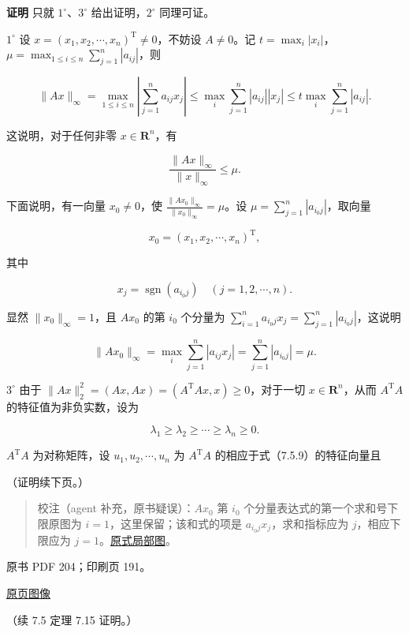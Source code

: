 \documentclass[
  10pt,
  fontset=fandol]{ctexart}
\begin{document}
\textbf{证明} 只就 \(1^\circ\)、\(3^\circ\) 给出证明，\(2^\circ\)
同理可证。

\(1^\circ\) 设 \(x=(x_1,x_2,\cdots,x_n)^{\mathrm T}\neq0\)，不妨设
\(A\neq0\)。记
\(t=\max_i|x_i|\)，\(\mu=\max_{1\leqslant i\leqslant n}\sum_{j=1}^{n}|a_{ij}|\)，则

\[
\|Ax\|_\infty
=\max_{1\leqslant i\leqslant n}\left|\sum_{j=1}^{n}a_{ij}x_j\right|
\leqslant\max_i\sum_{j=1}^{n}|a_{ij}||x_j|
\leqslant t\max_i\sum_{j=1}^{n}|a_{ij}|.
\]

这说明，对于任何非零 \(x\in\mathbf R^n\)，有

\[
\frac{\|Ax\|_\infty}{\|x\|_\infty}\leqslant\mu.
\tag{7.5.8}
\]

下面说明，有一向量 \(x_0\neq0\)，使
\(\frac{\|Ax_0\|_\infty}{\|x_0\|_\infty}=\mu\)。设
\(\mu=\sum_{j=1}^{n}|a_{i_0j}|\)，取向量

\[
x_0=(x_1,x_2,\cdots,x_n)^{\mathrm T},
\]

其中

\[
x_j=\operatorname{sgn}(a_{i_0j})\quad(j=1,2,\cdots,n).
\]

显然 \(\|x_0\|_\infty=1\)，且 \(Ax_0\) 的第 \(i_0\) 个分量为
\(\sum_{i=1}^{n}a_{i_0j}x_j=\sum_{j=1}^{n}|a_{i_0j}|\)，这说明

\[
\|Ax_0\|_\infty=\max_i\sum_{j=1}^{n}|a_{ij}x_j|=\sum_{j=1}^{n}|a_{i_0j}|=\mu.
\]

\(3^\circ\) 由于
\(\|Ax\|_2^2=(Ax,Ax)=(A^{\mathrm T}Ax,x)\geqslant0\)，对于一切
\(x\in\mathbf R^n\)，从而 \(A^{\mathrm T}A\) 的特征值为非负实数，设为

\[
\lambda_1\geqslant\lambda_2\geqslant\cdots\geqslant\lambda_n\geqslant0.
\tag{7.5.9}
\]

\(A^{\mathrm T}A\) 为对称矩阵，设 \(u_1,u_2,\cdots,u_n\) 为
\(A^{\mathrm T}A\) 的相应于式（7.5.9）的特征向量且

（证明续下页。）

\begin{quote}
校注（agent 补充，原书疑误）：\(Ax_0\) 第 \(i_0\)
个分量表达式的第一个求和号下限原图为 \(i=1\)，这里保留；该和式的项是
\(a_{i_0j}x_j\)，求和指标应为 \(j\)，相应下限应为
\(j=1\)。\href{../../../staging/ch07b/assets/203-sum-index.png}{原式局部图}。
\end{quote}

\clearpage

原书 PDF 204；印刷页 191。

\href{../../../source-images/pdf-204.jpeg}{原页图像}

（续 7.5 定理 7.15 证明。）
\end{document}
